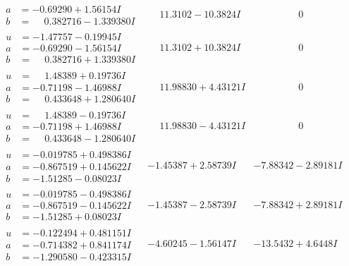 \documentclass[1p]{elsarticle_modified}
\theoremstyle{definition}
\begin{document}
$$\begin{array}{c|c|c}
\begin{aligned}
a &= -0.69290 + 1.56154 I \\
b &= \phantom{-}0.382716 - 1.339380 I\end{aligned}
 & \phantom{-}11.3102 - 10.3824 I & \phantom{-0.000000 } 0 \\ \hline\begin{aligned}
u &= -1.47757 - 0.19945 I \\
a &= -0.69290 - 1.56154 I \\
b &= \phantom{-}0.382716 + 1.339380 I\end{aligned}
 & \phantom{-}11.3102 + 10.3824 I & \phantom{-0.000000 } 0 \\ \hline\begin{aligned}
u &= \phantom{-}1.48389 + 0.19736 I \\
a &= -0.71198 - 1.46988 I \\
b &= \phantom{-}0.433648 + 1.280640 I\end{aligned}
 & \phantom{-}11.98830 + 4.43121 I & \phantom{-0.000000 } 0 \\ \hline\begin{aligned}
u &= \phantom{-}1.48389 - 0.19736 I \\
a &= -0.71198 + 1.46988 I \\
b &= \phantom{-}0.433648 - 1.280640 I\end{aligned}
 & \phantom{-}11.98830 - 4.43121 I & \phantom{-0.000000 } 0 \\ \hline\begin{aligned}
u &= -0.019785 + 0.498386 I \\
a &= -0.867519 + 0.145622 I \\
b &= -1.51285 - 0.08023 I\end{aligned}
 & -1.45387 + 2.58739 I & -7.88342 - 2.89181 I \\ \hline\begin{aligned}
u &= -0.019785 - 0.498386 I \\
a &= -0.867519 - 0.145622 I \\
b &= -1.51285 + 0.08023 I\end{aligned}
 & -1.45387 - 2.58739 I & -7.88342 + 2.89181 I \\ \hline\begin{aligned}
u &= -0.122494 + 0.481151 I \\
a &= -0.714382 + 0.841174 I \\
b &= -1.290580 - 0.423315 I\end{aligned}
 & -4.60245 - 1.56147 I & -13.5432 + 4.6448 I \\ \hline\begin{aligned}

\end{aligned}
\end{array}$$
\end{document}
